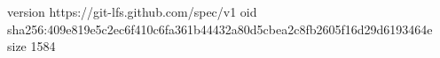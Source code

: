 version https://git-lfs.github.com/spec/v1
oid sha256:409e819e5c2ec6f410c6fa361b44432a80d5cbea2c8fb2605f16d29d6193464e
size 1584
